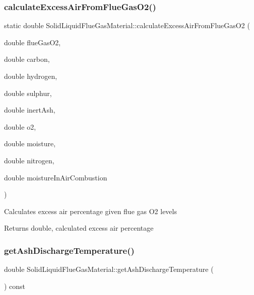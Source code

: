 \subsubsection{\texorpdfstring{calculate\+Excess\+Air\+From\+Flue\+Gas\+O2()}{calculateExcessAirFromFlueGasO2()}\hspace{0.1cm}{\footnotesize\ttfamily [3/3]}}
{\footnotesize\ttfamily static double Solid\+Liquid\+Flue\+Gas\+Material\+::calculate\+Excess\+Air\+From\+Flue\+Gas\+O2 (\begin{DoxyParamCaption}\item[{double}]{flue\+Gas\+O2,  }\item[{double}]{carbon,  }\item[{double}]{hydrogen,  }\item[{double}]{sulphur,  }\item[{double}]{inert\+Ash,  }\item[{double}]{o2,  }\item[{double}]{moisture,  }\item[{double}]{nitrogen,  }\item[{double}]{moisture\+In\+Air\+Combustion }\end{DoxyParamCaption})\hspace{0.3cm}{\ttfamily [static]}}

Calculates excess air percentage given flue gas O2 levels \begin{DoxyReturn}{Returns}
double, calculated excess air percentage 
\end{DoxyReturn}
\mbox{\label{class_solid_liquid_flue_gas_material_ab233d4e27397cc74fbe2d3084e4e6f7c}} 
\subsubsection{\texorpdfstring{get\+Ash\+Discharge\+Temperature()}{getAshDischargeTemperature()}\hspace{0.1cm}{\footnotesize\ttfamily [1/3]}}
{\footnotesize\ttfamily double Solid\+Liquid\+Flue\+Gas\+Material\+::get\+Ash\+Discharge\+Temperature (\begin{DoxyParamCaption}{ }\end{DoxyParamCaption}) const\hspace{0.3cm}{\ttfamily [inline]}}


